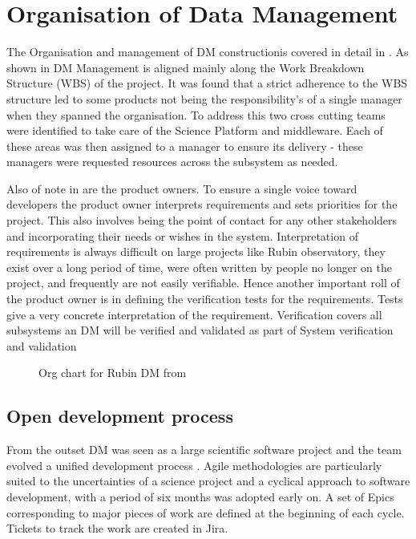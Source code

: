 
\section{Organisation of Data Management} \label{sec:org}

The Organisation and management of DM constructionis covered in detail in \citet{LDM-294}.
As shown in  DM Management is aligned mainly along the Work Breakdown Structure (WBS) of the project.
It was found that a strict adherence to the WBS structure led to some products not being the responsibility's of a single manager when they spanned the organisation.
To address this two cross cutting teams were identified  to take care of the Science Platform and middleware.
Each of these areas was then assigned to a manager to ensure its delivery - these managers were requested resources across the subsystem as needed.

Also of note in  are the product owners.
To ensure a single voice toward developers the product owner interprets requirements and sets priorities for the
project.
This also involves being the point of contact for any other stakeholders and incorporating their needs or wishes in the system.
Interpretation of requirements is always difficult on large projects like Rubin observatory, they exist over a long period of time, were often written by people no longer on the project, and frequently are not easily verifiable.
Hence another important roll of the product owner is in defining the verification tests for the requirements.
Tests give a very concrete interpretation of the requirement.
Verification covers all subsystems an DM will be verified and validated as part of System verification and validation \citep{2014SPIE.9150E..0NS}



\begin{figure}
\caption{Org chart for Rubin DM from \citet{LDM-294}\label{fig:org}}
\end{figure}

\subsection{Open development process}\label{sec:devproc}

From the outset DM was seen as a large scientific software project and the team evolved a unified development process \citep{2018SPIE10707E..09J}.
Agile methodologies \citep{it:agile}  are particularly suited to the uncertainties of a science project and
a cyclical approach to software development, with a period of six months was adopted early on.
A set of Epics corresponding to major pieces of work are defined at the beginning of each cycle.
Tickets to track the work are created in Jira.

